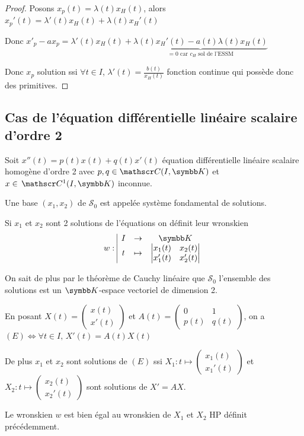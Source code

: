 \begin{proof}
    Posons $x_p(t) = \lambda(t) x_H(t)$, alors $x_p'(t) = \lambda'(t) x_H(t) + \lambda(t) x_H'(t)$

    Donc $x'_p - ax_p = \lambda'(t) x_H(t) + \underbrace{\lambda(t) x_H'(t) - a(t) \lambda(t) x_H(t)}_{ = 0 \text{ car } c_H \text{ sol de l'ESSM}}$

    Donc $x_p$ solution ssi 
    $\forall t \in I$, $\lambda'(t) = \frac{b(t)}{x_H(t)}$ fonction continue qui possède 
    donc des primitives. 
\end{proof}

\subsection{Cas de l'équation différentielle linéaire scalaire d'ordre 2}

\begin{definition}{}{}
    Soit $x''(t) = p(t) x(t) + q(t) x'(t)$ équation différentielle linéaire scalaire homogène
    d'ordre 2 avec $p, q \in \mathscr C(I, \K)$ et $x \in \mc 1 (I, \K)$ inconnue. 

    Une base $(x_1, x_2)$ de $\mathscr S_0$ est appelée système fondamental de solutions. 

    Si $x_1$ et $x_2$ sont 2 solutions de l'équations on définit leur wronskien 
    $$\fonction{w}{I}{\K}{t}{\begin{vmatrix}
        x_1(t) & x_2(t) \\
        x_1'(t) & x_2'(t)
    \end{vmatrix}}$$
\end{definition}

\begin{remarque}
    On sait de plus par le théorème de Cauchy linéaire que $\mathscr S_0$ l'ensemble des solutions est 
    un $\K$-espace vectoriel de dimension 2.
\end{remarque}

\begin{remarque}
    En posant $X(t) = \begin{pmatrix}
    x(t) \\ x'(t)
    \end{pmatrix}$ et $A(t) = \begin{pmatrix}
    0 & 1 \\
    p(t) & q(t)
    \end{pmatrix}$, on a $(E) \Leftrightarrow \forall t \in I, \, X'(t) = A(t) X(t)$

    De plus $x_1$ et $x_2$ sont solutions de $(E)$ ssi $X_1 : t \mapsto \begin{pmatrix}
    x_1(t) \\ x_1'(t)
    \end{pmatrix}$ et $X_2 : t \mapsto \begin{pmatrix}
    x_2(t) \\ x_2'(t)
    \end{pmatrix}$ sont solutions de $X' = AX$.

    Le wronskien $w$ est bien égal au wronskien de $X_1$ et $X_2$ HP définit précédemment. 
\end{remarque}

